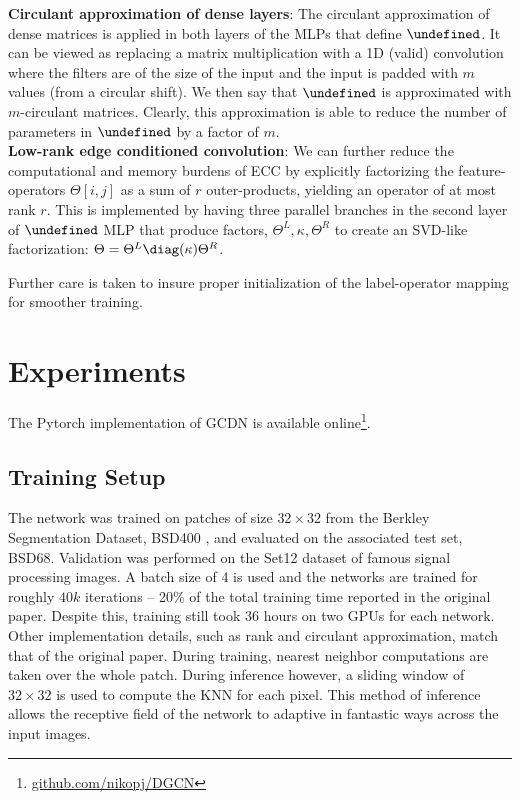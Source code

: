 \documentclass[12pt,a4paper,reqno]{amsart}
\let\F\undefined
\newcommand{\F}{\mathcal{F}}
\begin{document}
\textbf{Circulant approximation of dense layers}: The circulant approximation of
dense matrices is applied in both layers of the MLPs that define $\F$. It can be
viewed as replacing a matrix multiplication with a 1D (valid) convolution where
the filters are of the size of the input and the input is padded with $m$ values
(from a circular shift). We then say that $\F$ is approximated with
$m$-circulant matrices. Clearly, this approximation is able to reduce the number
of parameters in $\F$ by a factor of $m$.  \\

\textbf{Low-rank edge conditioned convolution}: We can further reduce the
computational and memory burdens of ECC by explicitly factorizing the
feature-operators $\Theta[i,j]$ as a sum of $r$ outer-products, yielding an
operator of at most rank $r$. This is implemented by having three parallel
branches in the second layer of $\F$ MLP that produce factors, $\Theta^L,
\kappa, \Theta^R$ to create an SVD-like factorization: $\Theta = \Theta^L
\diag(\kappa) \Theta^R$.

Further care is taken to insure proper initialization of the label-operator
mapping for smoother training. 

\section{Experiments} \label{sec:experiments}
The Pytorch implementation of GCDN is available
online\footnote{\url{github.com/nikopj/DGCN}}.

\subsection{Training Setup}
The network was trained on patches of size $32\times 32$ from the Berkley
Segmentation Dataset, BSD400 \cite{bsd}, and evaluated on the associated test
set, BSD68. Validation was performed on the Set12 dataset of famous signal
processing images. A batch size of 4 is used and the networks are trained for roughly
$40k$ iterations -- 20\% of the total training time reported in the original
paper. Despite this, training still took 36 hours on two GPUs for each network.
Other implementation details, such as rank and circulant approximation, match
that of the original paper. During training, nearest neighbor computations are
taken over the whole patch. During inference however, a sliding window of
$32\times 32$ is used to compute the KNN for each pixel. This method of
inference allows the receptive field of the network to adaptive in fantastic
ways across the input images.
\end{document}
